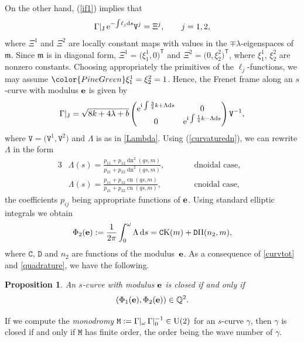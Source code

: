 \documentclass[10pt,a4paper]{amsart}
\newcommand\kk{k} %
\def\ri{\mathrm{i}}
\newcommand{\ds}{\,{\rm d}s}
\def\gam{\gamma} %
\newcommand\be{{\bf e}}
\newcommand\cn{\operatorname{cn}}
\newcommand\dn{\operatorname{dn}}
\newcommand\tomedit[1]{{\color{PineGreen}#1}}
\numberwithin{equation}{section}
\newtheorem{Proposition}[Theorem]{Proposition}
 { \theoremstyle{definition}
\newtheorem{Definition}[Theorem]{Definition}
\newtheorem{Note}[Theorem]{Note}
\newtheorem{Example}[Theorem]{Example}
\newtheorem{Remark}[Theorem]{Remark} }
\begin{document}
On the other hand, (\ref{if1}) implies that
\begin{equation*}%
\Gamma|_{{\rm J}}\, {\rm e}^{-{\int \! \ell_j {\rm d}s}} {\mathtt V}^j= \Xi^j,\qquad j=1,2,
\end{equation*}
where $\Xi^1$ and $\Xi^2$ are locally constant maps with values in the $\mp\lambda$-eigenspaces of ${\mathfrak m}$.
Since ${\mathfrak m}$ is in diagonal form, $\Xi^1=\bigl(\xi_1^1,0\bigr)^{\mathsf{T}}$ and $\Xi^2=\bigl(0,\xi_2^2\bigr)^{\mathsf{T}}$, where $\xi_1^1$, $\xi_2^2$ are nonzero constants. Choosing appropriately the primitives of the $\ell_j$-functions, we may assume $\tomedit{\xi^1_1}=\xi^2_2=1$. Hence, the Frenet frame along an $s$-curve with modulus $\be$ is given by
\begin{equation}\label{quadrature}
\Gamma|_{{\rm J}}=\sqrt{8\kk+4\lambda+b}
 \begin{pmatrix} {\rm e}^{\ri \int\frac{3}{4}\kk +\Lambda {\rm d}s} & 0 \\ 0 & {\rm e}^{\ri \int \frac{1}{4}\kk -\Lambda {\rm d}s}\end{pmatrix} {\mathtt V}^{-1},
\end{equation}
where ${\mathtt V}=\bigl({\mathtt V}^1,{\mathtt V}^2\bigr)$ and $\Lambda$ is as in \eqref{Lambda}.
Using (\ref{curvaturedn}), we can rewrite $\Lambda$ in the form
\begin{alignat*}{3}%
&\Lambda(s)=
 \frac{p_{11}+p_{12}\dn^2(qs,m)}{p_{21}+p_{22}\dn^2(qs,m)},\qquad && \text{dnoidal case,}& \\
&\Lambda(s)= \frac{p_{11}+p_{12}\cn(qs,m)}{p_{21}+p_{22}\cn(qs,m)},\qquad && \text{cnoidal case},&
\end{alignat*}
the coefficients $p_{ij}$ being appropriate functions of $\be$. Using standard elliptic integrals we obtain
\[
\Phi_2(\be):=\frac{1}{2\pi}\int_0^{\omega} \Lambda \ds={\mathtt C}{\rm K}(m)+{\mathtt D}\Pi(n_2,m),
\]
where ${\mathtt C}$, ${\mathtt D}$ and $n_2$ are functions of the modulus~$\be$. As a consequence of \eqref{curvtot} and \eqref{quadrature}, we have the following.

\begin{Proposition} An $s$-curve with modulus $\be$ is closed if and only if
\[(\Phi_1(\be),\Phi_2(\be))\in {\mathbb Q}^2.\]\end{Proposition}

\begin{Remark}%
If we compute the {\it monodromy} ${\mathtt M}:=\Gamma|_{\omega}\, \Gamma|_0^{-1}\in {\rm U}(2)$ for an $s$-curve $\gam$, then $\gam$ is closed if and only if ${\mathtt M}$ has finite order, the order
being the wave number of $\gam$.\end{Remark}
\end{document}
